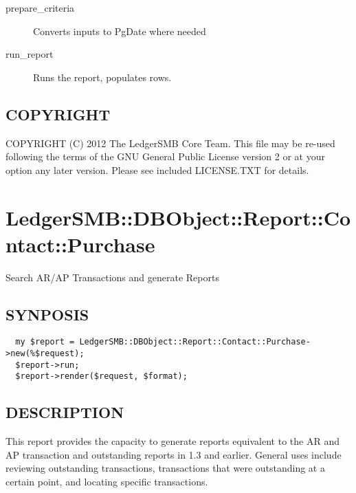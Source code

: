 \begin{description}
\begin{description}
\begin{description}
\begin{description}
\begin{description}
\begin{description}
\begin{description}
\begin{description}
\begin{description}
\begin{description}
\begin{description}
\item[{prepare\_criteria}] \mbox{}

Converts inputs to PgDate where needed


\item[{run\_report}] \mbox{}

Runs the report, populates rows.

\end{description}
\subsection*{COPYRIGHT\label{LedgerSMB::DBObject::Report::Contact::History_COPYRIGHT}}


COPYRIGHT (C) 2012 The LedgerSMB Core Team.  This file may be re-used following
the terms of the GNU General Public License version 2 or at your option any
later version.  Please see included LICENSE.TXT for details.

\section{LedgerSMB::DBObject::Report::Contact::Purchase\label{LedgerSMB::DBObject::Report::Contact::Purchase}}


Search AR/AP Transactions and
generate Reports

\subsection*{SYNPOSIS\label{LedgerSMB::DBObject::Report::Contact::Purchase_SYNPOSIS}}
\begin{verbatim}
  my $report = LedgerSMB::DBObject::Report::Contact::Purchase->new(%$request);
  $report->run;
  $report->render($request, $format);
\end{verbatim}
\subsection*{DESCRIPTION\label{LedgerSMB::DBObject::Report::Contact::Purchase_DESCRIPTION}}


This report provides the capacity to generate reports equivalent to the AR and
AP transaction and outstanding reports in 1.3 and earlier.  General uses include
reviewing outstanding transactions, transactions that were outstanding at a
certain point, and locating specific transactions.


\end{description}
\end{description}
\end{description}
\end{description}
\end{description}
\end{description}
\end{description}
\end{description}
\end{description}
\end{description}
